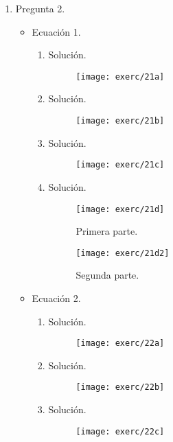 \documentclass[fleqn]{article}
\begin{document}
\begin{enumerate}
\item Pregunta 2.
  \begin{itemize}
  \item Ecuación 1.
    \begin{enumerate}[label=\alph*)]
    \item Solución.
      \begin{figure}[H]
        \centering
        \texttt{[image: exerc/21a]}
      \end{figure}
    \item Solución.
      \begin{figure}[H]
        \centering
        \texttt{[image: exerc/21b]}
      \end{figure}

    \item Solución.
      \begin{figure}[H]
        \centering
        \texttt{[image: exerc/21c]}
      \end{figure}

    \item Solución.
      \begin{figure}[H]
        \centering
        \texttt{[image: exerc/21d]}
        \caption{Primera parte.}
      \end{figure}
      \begin{figure}[H]
        \centering
        \texttt{[image: exerc/21d2]}
        \caption{Segunda parte.}
      \end{figure}
    \end{enumerate}

  \item Ecuación 2.
    \begin{enumerate}[label=\alph*)]
    \item Solución.
      \begin{figure}[H]
        \centering
        \texttt{[image: exerc/22a]}
      \end{figure}
    \item Solución.
      \begin{figure}[H]
        \centering
        \texttt{[image: exerc/22b]}
      \end{figure}

    \item Solución.
      \begin{figure}[H]
        \centering
        \texttt{[image: exerc/22c]}
      \end{figure}


\end{enumerate}
\end{itemize}
\end{enumerate}
\end{document}
